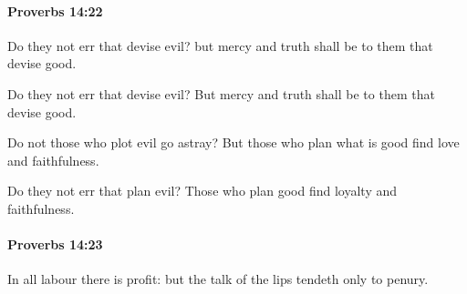 		\paragraph{Proverbs 14:22} %
			\label{PROVERBS-14-22}

			Do they not err that devise evil? but mercy and truth shall be to them that devise good.

			\begin{versebox}
					\item[BHS] 
					\item[ASV] Do they not err that devise evil? But mercy and truth shall be to them that devise good.
					\item[NIV] Do not those who plot evil go astray? But those who plan what is good find love and faithfulness.
					\item[NRSV] Do they not err that plan evil? Those who plan good find loyalty and faithfulness.
			\end{versebox}

		\paragraph{Proverbs 14:23} %
			\label{PROVERBS-14-23}

			In all labour there is profit: but the talk of the lips tendeth only to penury.

